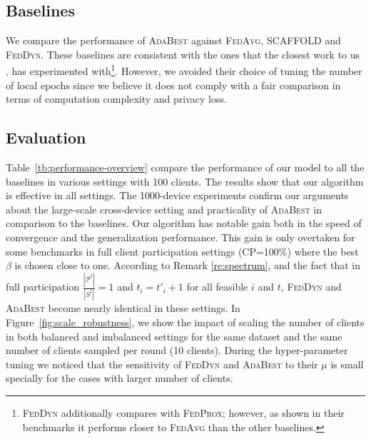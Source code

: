 \documentclass[runningheads]{llncs}
\def\figref#1{Figure~\ref{#1}}
\def\tableref#1{Table~\ref{#1}}
\def\gP{{\mathcal{P}}}
\newcommand{\fedavg}{\textsc{FedAvg}\xspace}
\newcommand{\scaffold}{\textsc{SCAFFOLD}\xspace}
\newcommand{\fedprox}{\textsc{FedProx}\xspace}
\newcommand{\feddyn}{\textsc{FedDyn}\xspace}
\newcommand{\ours}{\textsc{AdaBest}\xspace}
\begin{document}
\subsection{Baselines}
We compare the performance of \ours against \fedavg \cite{mcmahan2017communication}, \scaffold \cite{karimireddy2020scaffold} and \feddyn \cite{acar2021federated}. These baselines are consistent with the ones that the closest work to us \cite{acar2021federated}, has experimented with\footnote{\feddyn additionally compares with \fedprox \cite{li2020federated}; however, as shown in their benchmarks it performs closer to \fedavg than the other baselines.}. However, we avoided their choice of tuning the number of local epochs since we believe it does not comply with a fair comparison in terms of computation complexity and privacy loss. 


\subsection{Evaluation}
\tableref{tb:performance-overview} compare the performance of our model to all the baselines in various settings with 100 clients. The results show that our algorithm is effective in all settings. The 1000-device experiments confirm our arguments about the large-scale cross-device setting and practicality of \ours in comparison to the baselines. Our algorithm has notable gain both in the speed of convergence and the generalization performance. This gain is only overtaken for some benchmarks in full client participation settings (CP=100\%) where the best $\beta$ is chosen close to one. According to Remark \ref{re:spectrum}, and the fact that in full participation $\frac{|\gP^t|}{|S^t|}=1$ and $t_i = t'_i + 1$ for all feasible $i$ and $t$, \feddyn and \ours become nearly identical in these settings. In \figref{fig:scale_robustness}, we show the impact of scaling the number of clients in both balanced and imbalanced settings for the same dataset and the same number of clients sampled per round (10 clients). During the hyper-parameter tuning we noticed that the sensitivity of \feddyn and \ours to their $\mu$ is small specially for the cases with larger number of clients. 
\end{document}
